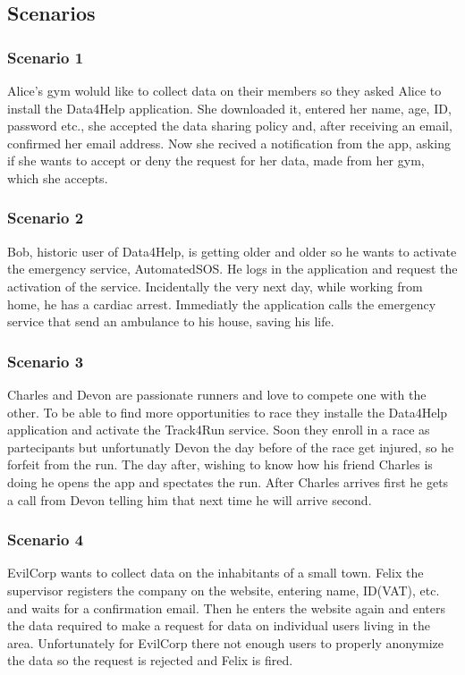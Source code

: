 \subsection{Scenarios}
\subsubsection{Scenario 1}
Alice's gym woluld like to collect data on their members so they asked Alice to install the Data4Help application. She downloaded it, entered her name, age, ID, password etc., she accepted the data sharing policy and, after receiving an email, confirmed her email address. Now she recived a notification from the app, asking if she wants to accept or deny the request for her data, made from her gym, which she accepts.
\subsubsection{Scenario 2}
Bob, historic user of Data4Help, is getting older and older so he wants to activate the emergency service, AutomatedSOS. He logs in the application and request the activation of the service.
Incidentally the very next day, while working from home, he has a cardiac arrest. Immediatly the application calls the emergency service that send an ambulance to his house, saving his life.
\subsubsection{Scenario 3}
Charles and Devon are passionate runners and love to compete one with the other. To be able to find more opportunities to race they installe the Data4Help application and activate the Track4Run service. Soon they enroll in a race as partecipants but unfortunatly Devon the day before of the race get injured, so he forfeit from the run. The day after, wishing to know how his friend Charles is doing he opens the app and spectates the run. After Charles arrives first he gets a call from Devon telling him that next time he will arrive second.
\subsubsection{Scenario 4}
EvilCorp wants to collect data on the inhabitants of a small town. Felix the supervisor registers the company on the website, entering name, ID(VAT), etc. and waits for a confirmation email. Then he enters the website again and enters the data required to make a request for data on individual users living in the area. Unfortunately for EvilCorp there not enough users to properly anonymize the data so the request is rejected and Felix is fired.
